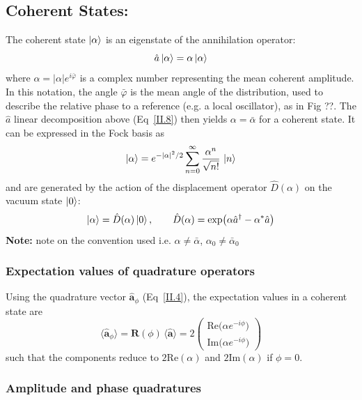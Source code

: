 \subsection*{Coherent States:}
The coherent state $\ket{\alpha}$ is an eigenstate of the annihilation operator:
\begin{equation}
\hat{a}\ket{\alpha} = \alpha \ket{\alpha}
\label{II.14}
\end{equation}
where $\alpha = |\alpha| e^{i\bar{\varphi}}$ is a complex number representing the mean coherent amplitude. In this notation, the angle $\bar{\varphi}$ is the mean angle of the distribution, used to describe the relative phase to a reference (e.g. a local oscillator), as in Fig ??. The $\hat{a}$ linear decomposition above (Eq~\eqref{II.8}) then yields $\alpha = \bar{\alpha}$ for a coherent state. It can be expressed in the Fock basis as
\begin{equation}
\ket{\alpha} = e^{-|\alpha|^2/2} \sum_{n=0}^\infty \frac{\alpha^n}{\sqrt{n!}}\,\ket{n}
\label{II.15}
\end{equation}
and are generated by the action of the displacement operator $\hat{D}(\alpha)$ on the vacuum state $\ket{0}$:
\begin{equation}
\ket{\alpha} = \hat{D}(\alpha)\ket{0},\qquad \hat{D}(\alpha) = \exp\!\left(\alpha \hat{a}^\dagger - \alpha^* \hat{a}\right)
\label{II.16}
\end{equation}
\noindent \textbf{Note:} \color{red} note on the convention used i.e. $\alpha \neq \bar{\alpha}$, $\alpha_0 \neq \bar{\alpha}_0$ \color{black}
\subsubsection*{Expectation values of quadrature operators}

Using the quadrature vector $\hat{\mathbf{a}}_\phi$ (Eq~\ref{II.4}), the expectation values in a coherent state are
\begin{equation}
\langle \hat{\mathbf a}_\phi\rangle
= \mathbf R(\phi)\,\langle \hat{\mathbf a}\rangle
=
2\begin{pmatrix}
\mathrm{Re}\big(\alpha e^{-i\phi}\big) \\[2pt]
\mathrm{Im}\big(\alpha e^{-i\phi}\big)
\end{pmatrix}
\end{equation}
such that the components reduce to $2\mathrm{Re} (\alpha)$ and  $2\mathrm{Im} (\alpha)$ if $\phi=0$. 

\subsubsection*{Amplitude and phase quadratures}

